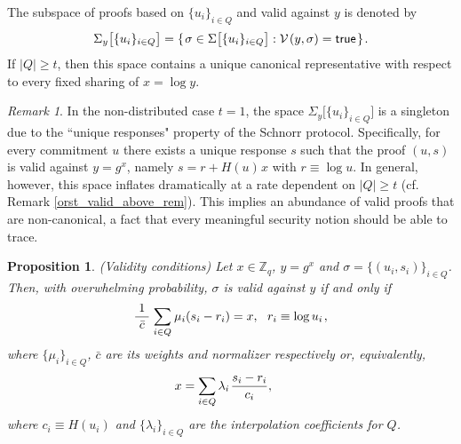 \documentclass[psamsfonts, reqno]{amsart}
\newtheorem{prop}[thm]{Proposition}
\theoremstyle{definition}
\theoremstyle{remark}
\newtheorem{rem}[thm]{Remark}
\numberwithin{equation}{section}
\begin{document}
\noindent
The subspace of proofs based on
$\{u_i\}_{i \in Q}$ and valid against $y$ is denoted by
\vspace{5pt}
\begin{equation}\label{orst_valid_proofs_on_commitments_def}
\Sigma_y \big[\{u_i\}_{i \in Q}\big] =
\{
	\hspace{1pt}
	\sigma \in \Sigma\big[\{u_i\}_{i \in Q}\big]:
	\mathcal{V}\hspace{1pt}(y, \sigma) = \mathsf{true}
	\hspace{1pt}
\}\hspace{1pt}.
\vspace{5pt}
\end{equation}
If $|Q| \ge t$, then this space
contains a unique canonical representative
with respect to every fixed sharing of $x = \log y$.

\begin{rem}
In the non-distributed case $t=1$, the space
$\Sigma_y \big[\{u_i\}_{i \in Q}\big]$
is a singleton due to the ``unique responses" property
of the Schnorr protocol.
Specifically, for every commitment $u$
there exists a unique response $s$
such that the proof $(u, s)$ is valid against $y=g^x$,
namely $s = r + H(u)\hspace{1pt}x$ with $r \equiv \log u$.
In general, however,
this space inflates dramatically
at a rate dependent on $|Q| \ge t$
(cf. Remark \ref{orst_valid_above_rem}).
This implies an abundance of valid proofs that
are non-canonical, a fact that
every meaningful security notion should be able to trace.
\end{rem}

\begin{prop}\label{orst_validity_conditions}
\textup{(\textit{Validity conditions})}
Let $x \in \mathbb{Z}_q$, $y = g ^ x$ and
$\sigma = \{(u_i, s_i)\}_{i \in Q}$.
Then, with overwhelming probability,
$\sigma$ is valid against $y$
if and only if
\vspace{5pt}
\begin{equation}\label{orst_verification_1}
\frac{1}{\ \bar{c}\ }
\hspace{1pt}
\sum_{i \in Q}
	\hspace{0.5pt} \mu_i (s_i - r_i)
=
x,
\ \ r_i \equiv \log u_i\hspace{1pt},
\vspace{5pt}
\end{equation}
where $\{\mu_i\}_{i \in Q}$, $\bar{c}$
are its weights and normalizer respectively
or, equivalently,
\vspace{5pt}
\begin{equation}\label{orst_verification_2}
\hspace{-12pt}x
=
\sum_{i \in Q} \lambda_i\hspace{1pt}\frac{s_i - r_i}{c_i},
\vspace{5pt}
\end{equation}
where $c_i \equiv H(u_i)$
and $\{\lambda_i\}_{i \in Q}$ are the interpolation
coefficients for $Q$.
\end{prop}
\end{document}

